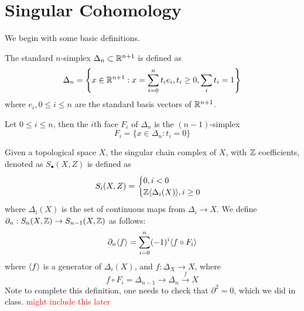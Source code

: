 \newpage
\chapter{Singular Cohomology}
We begin with some basic definitions.
\begin{defn}[$n$-simplex]
    The standard $n$-simplex $\Delta_n\subset\mathbb{R}^{n+1}$ is defined as 
    \begin{equation*}
        \Delta_n=\left\{x\in\mathbb{R}^{n+1}: x=\sum_{i=0}^nt_ie_i, t_i\geq 0, \sum_{i}t_i=1\right\}
    \end{equation*}
    where $e_i, 0\leq i\leq n$ are the standard basis vectors of $\mathbb{R}^{n+1}$.
\end{defn}
\begin{defn}[face]
    Let $0\leq i\leq n$, then the $i$th face $F_i$ of $\Delta_n$ is the $(n-1)$-simplex 
    \begin{equation*}
        F_i=\{x\in\Delta_n:t_i=0\}
    \end{equation*}
\end{defn}
\begin{defn}
    Given a topological space $X$, the singular chain complex of $X$, with $\mathbb{Z}$ coefficients, denoted as $S_\bullet(X,Z)$ is defined as 
    \begin{equation*}
        S_i(X,Z)=\begin{cases}
            0, i<0\\
            \mathbb{Z}\langle\Delta_i(X)\rangle, i\geq 0
        \end{cases}
    \end{equation*}
    where $\Delta_i(X)$ is the set of continuous maps from $\Delta_i\to X$. We define $\partial_n:S_n(X,\mathbb{Z})\to S_{n-1}(X,\mathbb{Z})$ as follows:
    \begin{equation*}
        \partial_n\langle f\rangle=\sum_{i=0}^n(-1)^i\langle f\circ F_i\rangle
    \end{equation*}
    where $\langle f\rangle$ is a generator of $\Delta_i(X)$, and $f:\Delta_X\to X$, where 
    \begin{equation*}
        f\circ F_i=\Delta_{n-1}\to\Delta_n\xrightarrow{f}X
    \end{equation*}
    Note to complete this definition, one needs to check that $\partial^2=0$, which we did in class. \textcolor{red}{might include this later}
\end{defn}

